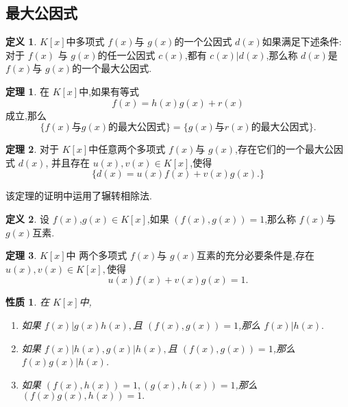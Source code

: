 \documentclass[a4paper,11pt]{article}%
\theoremstyle{remark}
\theoremstyle{definition}
\newtheorem{theorem}{定理}[section]
\theoremstyle{definition}
\newtheorem*{definition}{定义}
\theoremstyle{plain}
\newtheorem*{property}{性质}
\begin{document}
\subsection{最大公因式}
\begin{definition}
    $K[x]$中多项式 $f(x)$与 $g(x)$的一个公因式 $d(x)$如果满足下述条件:对于 $f(x)$
    与 $g(x)$的任一公因式 $c(x)$,都有 $c(x)|d(x)$,那么称 $d(x)$是 $f(x)$与 $g(x)$的一个最大公因式.
\end{definition}
\begin{theorem}
    在 $K[x]$中,如果有等式
    \[f(x)=h(x)g(x)+r(x)\]
    成立,那么
    \[\{f(x)\text{与}g(x)\text{的最大公因式}\}=\{g(x)\text{与}r(x)\text{的最大公因式}\}.\]
\end{theorem}
\begin{theorem}
    对于 $K[x]$中任意两个多项式 $f(x)$与 $g(x)$,存在它们的一个最大公因式 $d(x)$,
    并且存在 $u(x),v(x)\in K[x]$,使得
    \[\{d(x)=u(x)f(x)+v(x)g(x).\}\]
\end{theorem}
该定理的证明中运用了辗转相除法.
\begin{definition}
    设 $f(x)$,$g(x)\in K[x]$,如果 $(f(x),g(x))=1$,那么称 $f(x)$与 $g(x)$互素.
\end{definition}
\begin{theorem}
    $K[x]$中 两个多项式 $f(x)$与 $g(x)$互素的充分必要条件是,存在 $u(x),v(x)\in K[x],$使得
    \[u(x)f(x)+v(x)g(x)=1.\]
\end{theorem}
\begin{property}
    在 $K[x]$中,
\begin{enumerate}
\item 如果 $f(x)|g(x)h(x),$且 $(f(x),g(x))=1$,那么 $f(x)|h(x).$
\item 如果 $f(x)|h(x),g(x)|h(x),$且 $(f(x),g(x))=1$,那么 $f(x)g(x)|h(x)$.
\item 如果 $(f(x),h(x))=1,(g(x),h(x))=1$,那么 $(f(x)g(x),h(x))=1.$
\end{enumerate}
\end{property}
\end{document}
